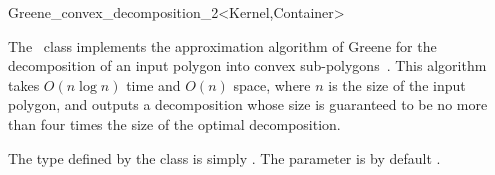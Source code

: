 
\ccRefPageBegin

\begin{ccRefClass}{Greene_convex_decomposition_2<Kernel,Container>}
\label{mink_ref:Greene_decomp}

\ccDefinition

The \ccRefName\ class implements the approximation algorithm of
Greene for the decomposition of an input polygon into convex
sub-polygons~\cite{g-dpcp-83}. This algorithm takes $O(n \log n)$
time and $O(n)$ space, where $n$ is the size of the input polygon,
and outputs a decomposition whose size is guaranteed to be no more
than four times the size of the optimal decomposition.

The  type defined by the class is simply
. The  parameter
is by default .


\ccIsModel

\ccSeeAlso
{}

\end{ccRefClass}

\ccRefPageEnd
